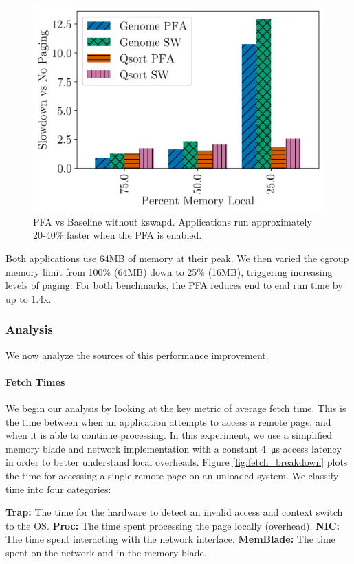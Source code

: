   \begin{figure}[h] \centering
    \includegraphics[width=0.6\columnwidth]{figs/perf_nokswapd.png}
    \vspace{-5mm}
    \caption{PFA vs Baseline without kswapd. Applications run approximately
    20-40\% faster when the PFA is enabled.}
    \label{fig:pfa_perf}
  \end{figure}
  \FloatBarrier

  Both applications use 64MB of memory at their peak. We then
  varied the cgroup memory limit from 100\% (64MB) down to 25\% (16MB),
  triggering increasing levels of paging. For both benchmarks, the PFA reduces
  end to end run time by up to 1.4x.

\subsubsection{Analysis}
  We now analyze the sources of this performance improvement.
  
  \paragraph{Fetch Times}
  We begin our analysis by looking at the key metric of average fetch time.
  This is the time between when an application attempts to access a remote
  page, and when it is able to continue processing. In this experiment, we use
  a simplified memory blade and network implementation with a constant
  \SI{4}{\micro\second} access latency in order to better understand local
  overheads. Figure \ref{fig:fetch_breakdown} plots the time for accessing a
  single remote page on an unloaded system. We classify time into four
  categories:

  \begin{outline}
    \1 \textbf{Trap:} The time for the hardware to detect an invalid access and
    context switch to the OS.
    \1 \textbf{Proc:} The time spent processing the page locally (overhead).
    \1 \textbf{NIC:} The time spent interacting with the network interface.
    \1 \textbf{MemBlade:} The time spent on the network and in the memory
    blade.
  \end{outline}

